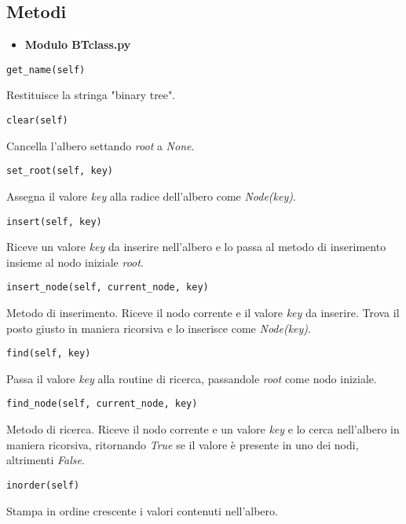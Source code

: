 \documentclass{article}
\begin{document}
\subsection{Metodi}
\begin{itemize}
    \item \textbf{Modulo BTclass.py}
\end{itemize}
\begin{verbatim}get_name(self)\end{verbatim}
Restituisce la stringa "binary tree".
\begin{verbatim}clear(self)\end{verbatim}
Cancella l'albero settando \emph{root} a \emph{None}.
\begin{verbatim}set_root(self, key)\end{verbatim}
Assegna il valore \emph{key} alla radice dell'albero come \emph{Node(key)}.
\begin{verbatim}insert(self, key)\end{verbatim}
Riceve un valore \emph{key} da inserire nell'albero e lo passa al metodo di inserimento insieme al nodo iniziale \emph{root}.
\begin{verbatim}insert_node(self, current_node, key)\end{verbatim}
Metodo di inserimento. Riceve il nodo corrente e il valore \emph{key} da inserire. Trova il posto giusto in maniera ricorsiva e lo inserisce come \emph{Node(key)}.
\begin{verbatim}find(self, key)\end{verbatim}
Passa il valore \emph{key} alla routine di ricerca, passandole \emph{root} come nodo iniziale.
\begin{verbatim}find_node(self, current_node, key)\end{verbatim}
Metodo di ricerca. Riceve il nodo corrente e un valore \emph{key} e lo cerca nell'albero in maniera ricorsiva, ritornando \emph{True} se il valore è presente in uno dei nodi, altrimenti \emph{False}.
\begin{verbatim}inorder(self)\end{verbatim}
Stampa in ordine crescente i valori contenuti nell'albero.\\
\end{document}
